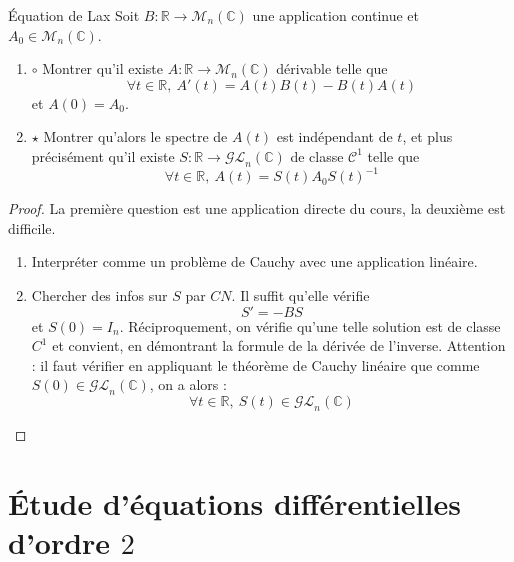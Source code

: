 \documentclass[french,a4paper]{article}
\newcommand{\R}{\mathbb{R}}
\newcommand{\C}{\mathbb{C}}
\newcommand{\inv}{^{-1}}
\theoremstyle{plain}
\theoremstyle{definition}
\theoremstyle{remark}
\begin{document}
\begin{ex}[Moulin.ED.39]{Équation de Lax}
	Soit $B:\R\to\mathcal{M}_n(\C)$ une application continue et $A_0\in\mathcal{M}_n(\C)$. 
	\begin{enumerate}
		\item $\circ$ Montrer qu'il existe $A:\R\to\mathcal{M}_n(\C)$ dérivable telle que $$\forall t\in\R,\ A'(t)=A(t)B(t)-B(t)A(t)$$ et $A(0)=A_0$.
		\item $\star$ Montrer qu'alors le spectre de $A(t)$ est indépendant de $t$, et plus précisément qu'il existe $S:\R\to\mathcal{GL}_n(\C)$ de classe $\mathcal{C}^1$ telle que $$\forall t\in\R,\ A(t)=S(t)A_0S(t)\inv$$
	\end{enumerate}
\end{ex}
\begin{proof}
	La première question est une application directe du cours, la deuxième est difficile.
	\begin{enumerate}
		\item Interpréter comme un problème de Cauchy avec une application linéaire.
		\item Chercher des infos sur $S$ par $CN$. Il suffit qu'elle vérifie $$S'=-BS$$ et $S(0)=I_n$. Réciproquement, on vérifie qu'une telle solution est de classe $C^1$ et convient, en démontrant la formule de la dérivée de l'inverse. Attention : il faut vérifier en appliquant le théorème de Cauchy linéaire que comme $S(0)\in\mathcal{GL}_n(\C)$, on a alors : $$\forall t\in\R,\ S(t)\in\mathcal{GL}_n(\C)$$
	\end{enumerate}
\end{proof}

\section{Étude d'équations différentielles d'ordre $2$}
\end{document}
